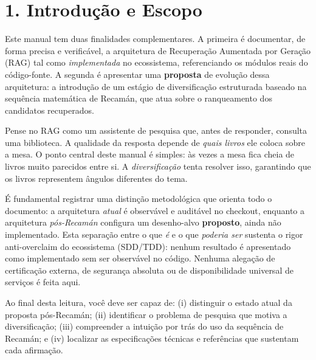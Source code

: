 
\section*{1. Introdução e Escopo}

 Este manual tem duas finalidades complementares. A primeira é documentar,
de forma precisa e verificável, a arquitetura de Recuperação Aumentada por
Geração (RAG) tal como \emph{implementada} no ecossistema, referenciando os
módulos reais do código-fonte. A segunda é apresentar uma \textbf{proposta} de
evolução dessa arquitetura: a introdução de um estágio de diversificação
estruturada baseado na sequência matemática de Recamán, que atua sobre o
ranqueamento dos candidatos recuperados.

\begin{intuicao}
Pense no RAG como um assistente de pesquisa que, antes de responder, consulta
uma biblioteca. A qualidade da resposta depende de \emph{quais livros} ele
coloca sobre a mesa. O ponto central deste manual é simples: às vezes a mesa fica
cheia de livros muito parecidos entre si. A \emph{diversificação} tenta resolver
isso, garantindo que os livros representem ângulos diferentes do tema.
\end{intuicao}

 É fundamental registrar uma distinção metodológica que orienta todo o
documento: a arquitetura \emph{atual} é observável e auditável no checkout,
enquanto a arquitetura \emph{pós-Recamán} configura um desenho-alvo
\textbf{proposto}, ainda não implementado. Esta separação entre o que \emph{é} e
o que \emph{poderia ser} sustenta o rigor anti-overclaim do ecossistema
(SDD/TDD): nenhum resultado é apresentado como implementado sem ser observável no
código. Nenhuma alegação de certificação externa, de segurança absoluta ou de
disponibilidade universal de serviços é feita aqui.

\begin{pontochave}
Ao final desta leitura, você deve ser capaz de: (i) distinguir o estado atual da
proposta pós-Recamán; (ii) identificar o problema de pesquisa que motiva a
diversificação; (iii) compreender a intuição por trás do uso da sequência de
Recamán; e (iv) localizar as especificações técnicas e referências que sustentam
cada afirmação.
\end{pontochave}

